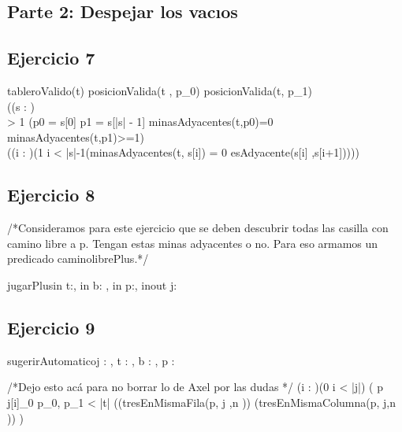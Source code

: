 \documentclass[a4paper]{article}
\begin{document}


\subsection*{Parte 2: Despejar los vacıos}

\subsection*{Ejercicio 7}


{ tableroValido(t) \y posicionValida(t , p_{0}) \y posicionValida(t, p_{1})\y \\
((\exists s : \TLista{\pos}) \\
 > 1 \yLuego (p0 = s[0] \y p1 = s[|s| - 1] \y minasAdyacentes(t,p0)=0 \y minasAdyacentes(t,p1)>=1) \y \\
((\forall i : \ent)(1 \leq i < |s|-1\implicaLuego (minasAdyacentes(t, s[i]) = 0 \y esAdyacente(s[i] ,s[i+1]))))}

\subsection*{Ejercicio 8}

/*Consideramos para este ejercicio que se deben descubrir todas las casilla con camino libre a p. Tengan estas minas adyacentes o no. Para eso armamos un predicado caminolibrePlus.*/

\begin{proc}{jugarPlus}{in t:\tablero, in b: \banderitas, in p:\pos, inout j: \jugadas}{}

\end{proc}

\subsection*{Ejercicio 9}
\begin{proc}{sugerirAutomatico}{\In j : \jugadas, \In t : \tablero , \In b : \banderitas, \Out p : \pos}{}
\end{proc}

/*Dejo esto acá para no borrar lo de Axel por las dudas */
(\forall i : \ent)(0 \leq i < |j|) \implicaLuego( p \neq j[i]_{0}  \leq p_{0}, p_{1} < |t| \y ((tresEnMismaFila(p, j ,n ))  \vee  (tresEnMismaColumna(p, j,n )) )
\end{document}
